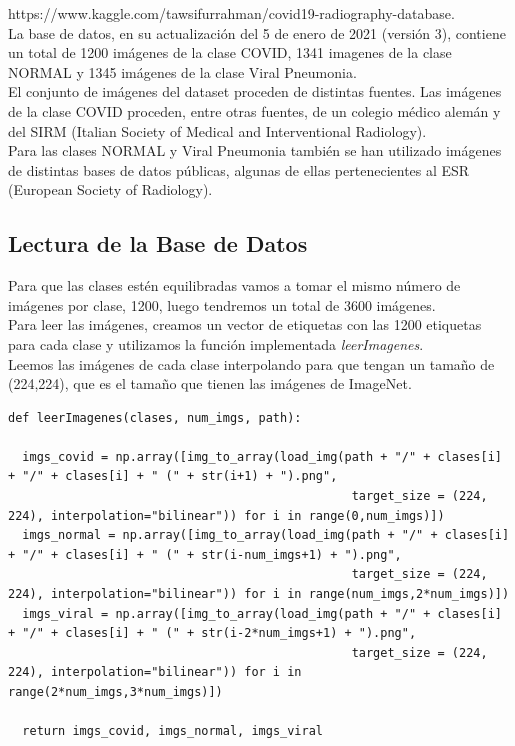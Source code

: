 \documentclass[11pt,a4paper]{article}
\theoremstyle{definition}
\begin{document}
https://www.kaggle.com/tawsifurrahman/covid19-radiography-database.\\

La base de datos, en su actualización del 5 de enero de 2021 (versión 3), contiene un total de 1200 imágenes de la clase COVID, 1341 imagenes de la clase NORMAL y 1345 imágenes de la clase Viral Pneumonia.\\

El conjunto de imágenes del dataset proceden de distintas fuentes. Las imágenes de la clase COVID proceden, entre otras fuentes, de un colegio médico alemán y del SIRM (Italian Society of Medical and Interventional Radiology).\\

Para las clases NORMAL y Viral Pneumonia también se han utilizado imágenes de distintas bases de datos públicas, algunas de ellas pertenecientes al ESR (European Society of Radiology).\\

\subsection{Lectura de la Base de Datos}

Para que las clases estén equilibradas vamos a tomar el mismo número de imágenes por clase, 1200, luego tendremos un total de 3600 imágenes.\\

Para leer las imágenes, creamos un vector de etiquetas con las 1200 etiquetas para cada clase y utilizamos la función implementada \textit{leerImagenes}.\\

Leemos las imágenes de cada clase interpolando para que tengan un tamaño de (224,224), que es el tamaño que tienen las imágenes de ImageNet.\\
\begin{lstlisting}
def leerImagenes(clases, num_imgs, path):
  
  imgs_covid = np.array([img_to_array(load_img(path + "/" + clases[i] + "/" + clases[i] + " (" + str(i+1) + ").png",
                                                target_size = (224, 224), interpolation="bilinear")) for i in range(0,num_imgs)])
  imgs_normal = np.array([img_to_array(load_img(path + "/" + clases[i] + "/" + clases[i] + " (" + str(i-num_imgs+1) + ").png",
                                                target_size = (224, 224), interpolation="bilinear")) for i in range(num_imgs,2*num_imgs)])
  imgs_viral = np.array([img_to_array(load_img(path + "/" + clases[i] + "/" + clases[i] + " (" + str(i-2*num_imgs+1) + ").png", 
                                                target_size = (224, 224), interpolation="bilinear")) for i in range(2*num_imgs,3*num_imgs)])

  return imgs_covid, imgs_normal, imgs_viral
\end{lstlisting}
\end{document}
